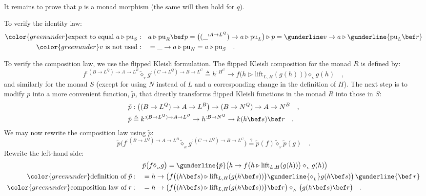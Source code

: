 It remains to prove that $p$ is a monad morphism (the same will then
hold for $q$).

To verify the identity law:
\begin{align*}
{\color{greenunder}\text{expect to equal }a\triangleright\text{pu}_{S}:}\quad & a\triangleright\text{pu}_{R}\bef p=\big((\_^{:A\rightarrow L^{Q}})\rightarrow a\triangleright\text{pu}_{L}\big)\triangleright p=\gunderline v\rightarrow a\triangleright\gunderline{\text{pu}_{L}\bef r}\\
{\color{greenunder}v\text{ is not used}:}\quad & =\_\rightarrow a\triangleright\text{pu}_{N}=a\triangleright\text{pu}_{S}\quad.
\end{align*}

To verify the composition law, we use the flipped Kleisli
formulation. The flipped Kleisli composition for the monad $R$ is
defined by:
\[
f^{:(B\rightarrow L^{Q})\rightarrow A\rightarrow L^{B}}\tilde{\diamond}_{_{T}}g^{:(C\rightarrow L^{Q})\rightarrow B\rightarrow L^{C}}\triangleq h^{:H^{C}}\rightarrow f\big(h\triangleright\text{lift}_{L,H}(g(h))\big)\diamond_{_{L}}g(h)\quad,
\]
and similarly for the monad $S$ (except for using $N$ instead of
$L$ and a corresponding change in the definition of $H$). The next
step is to modify $p$ into a more convenient function, $\tilde{p}$,
that directly transforms flipped Kleisli functions in the monad $R$
into those in $S$:
\begin{align*}
 & \tilde{p}:\big((B\rightarrow L^{Q})\rightarrow A\rightarrow L^{B}\big)\rightarrow(B\rightarrow N^{Q})\rightarrow A\rightarrow N^{B}\quad,\\
 & \tilde{p}\triangleq k^{:(B\rightarrow L^{Q})\rightarrow A\rightarrow L^{B}}\rightarrow h^{:B\rightarrow N^{Q}}\rightarrow k(h\bef s)\bef r\quad.
\end{align*}
We may now rewrite the composition law using $\tilde{p}$:
\[
\tilde{p}\big(f^{:(B\rightarrow L^{Q})\rightarrow A\rightarrow L^{B}}\tilde{\diamond}_{_{R}}g^{:(C\rightarrow L^{Q})\rightarrow B\rightarrow L^{C}}\big)\overset{?}{=}\tilde{p}(f)\tilde{\diamond}_{_{S}}\tilde{p}(g)\quad.
\]
Rewrite the left-hand side:
\begin{align*}
 & \tilde{p}\big(f\tilde{\diamond}_{_{R}}g\big)=\gunderline{\tilde{p}}\big(h\rightarrow f\big(h\triangleright\text{lift}_{L,H}(g(h))\big)\diamond_{_{L}}g(h)\big)\\
{\color{greenunder}\text{definition of }\tilde{p}:}\quad & =h\rightarrow\big(f\big((h\bef s)\triangleright\text{lift}_{L,H}(g(h\bef s))\big)\gunderline{\diamond_{_{L}}}g(h\bef s)\big)\,\gunderline{\bef\,r}\\
{\color{greenunder}\text{composition law of }r:}\quad & =h\rightarrow\big(f\big((h\bef s)\triangleright\text{lift}_{L,H}(g(h\bef s))\big)\bef r\big)\diamond_{_{N}}\big(g(h\bef s)\bef r\big)\quad.
\end{align*}
